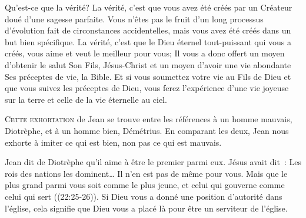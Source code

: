 Qu'est-ce que la vérité? La vérité, c'est que vous avez été créés
 par un Créateur doué d'une sagesse parfaite.
 Vous n'êtes pas le fruit d'un long processus d'évolution
 fait de circonstances accidentelles, mais vous avez été créés
 dans un but bien spécifique. La vérité, c'est que le Dieu éternel
 tout-puissant qui vous a créés, vous aime et veut le meilleur pour vous;
 Il vous a donc offert un moyen d'obtenir le salut
 \ocadr Son Fils, Jésus-Christ \fcadr{} et un moyen d'avoir une vie abondante
 \ocadr Ses préceptes de vie, la Bible.
 Et si vous soumettez votre vie au Fils de Dieu et que vous suivez
 les préceptes de Dieu, vous ferez l'expérience d'une vie joyeuse
 sur la terre et celle de la vie éternelle au ciel. 

\dvrule







\lettrine{C}{ette exhortation} de Jean se trouve entre les références
 à un homme mauvais, Diotrèphe, et à un homme bien, 
 Démétrius.
 En comparant les deux, Jean nous exhorte à imiter ce qui est bien, 
 non pas ce qui est mauvais. 

Jean dit de Diotrèphe qu'il \og aime à être le premier parmi eux. \fg{}
 Jésus avait dit~: 
 \og Les rois des nations les dominent\dots{}
 Il n'en est pas de même pour vous. Mais que le plus grand parmi vous
 soit comme le plus jeune, et celui qui gouverne comme celui qui sert \fg{}
 ((22:25-26)).
 Si Dieu vous a donné une position d'autorité dans l'église,
 cela signifie que Dieu vous a placé là pour être un serviteur de l'église.


